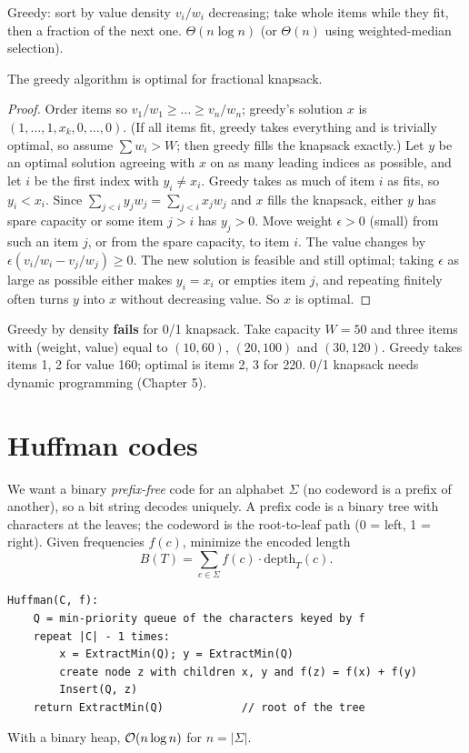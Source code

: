 Greedy: sort by value density $v_i/w_i$ decreasing; take whole items while they fit, then a fraction of the next one.
$\Theta(n\log n)$ (or $\Theta(n)$ using weighted-median selection).

\begin{theorem}
The greedy algorithm is optimal for fractional knapsack.
\end{theorem}
\begin{proof}
Order items so $v_1/w_1\ge\dots\ge v_n/w_n$; greedy's solution $x$ is $(1,\dots,1,x_k,0,\dots,0)$.
(If all items fit, greedy takes everything and is trivially optimal, so assume $\sum w_i>W$; then greedy fills the knapsack exactly.)
Let $y$ be an optimal solution agreeing with $x$ on as many leading indices as possible, and let $i$ be the first index with $y_i\ne x_i$.
Greedy takes as much of item $i$ as fits, so $y_i<x_i$. Since $\sum_{j<i}y_jw_j=\sum_{j<i}x_jw_j$ and $x$ fills the knapsack,
either $y$ has spare capacity or some item $j>i$ has $y_j>0$.
Move weight $\epsilon>0$ (small) from such an item $j$, or from the spare capacity, to item $i$. The value changes by
$\epsilon(v_i/w_i-v_j/w_j)\ge0$. The new solution is feasible and still optimal; taking $\epsilon$ as large as possible either makes $y_i=x_i$ or empties item $j$,
and repeating finitely often turns $y$ into $x$ without decreasing value. So $x$ is optimal.
\end{proof}

\begin{remark}
Greedy by density \textbf{fails} for 0/1 knapsack. Take capacity $W=50$ and three items with
(weight, value) equal to $(10,60)$, $(20,100)$ and $(30,120)$.
Greedy takes items 1, 2 for value 160; optimal is items 2, 3 for 220. 0/1 knapsack needs dynamic programming (Chapter 5).
\end{remark}

\section{Huffman codes}
We want a binary \emph{prefix-free} code for an alphabet $\Sigma$ (no codeword is a prefix of another), so a bit string decodes uniquely.
A prefix code is a binary tree with characters at the leaves; the codeword is the root-to-leaf path (0 = left, 1 = right).
Given frequencies $f(c)$, minimize the encoded length
\[
B(T)=\sum_{c\in\Sigma}f(c)\cdot\mathrm{depth}_T(c).
\]

\begin{lstlisting}[style=pseudo]
Huffman(C, f):
    Q = min-priority queue of the characters keyed by f
    repeat |C| - 1 times:
        x = ExtractMin(Q); y = ExtractMin(Q)
        create node z with children x, y and f(z) = f(x) + f(y)
        Insert(Q, z)
    return ExtractMin(Q)            // root of the tree
\end{lstlisting}
With a binary heap, $\mathcal{O}(n\log n)$ for $n=|\Sigma|$.

